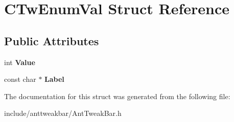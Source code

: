 \hypertarget{structCTwEnumVal}{\section{\-C\-Tw\-Enum\-Val \-Struct \-Reference}
\label{structCTwEnumVal}
}
\subsection*{\-Public \-Attributes}
\begin{DoxyCompactItemize}
\item 
\hypertarget{structCTwEnumVal_ab78c8475076e75b5797842df3aebf8dd}{int {\bfseries \-Value}}\label{structCTwEnumVal_ab78c8475076e75b5797842df3aebf8dd}

\item 
\hypertarget{structCTwEnumVal_a628d9a079774caec505059faa768519b}{const char $\ast$ {\bfseries \-Label}}\label{structCTwEnumVal_a628d9a079774caec505059faa768519b}

\end{DoxyCompactItemize}


\-The documentation for this struct was generated from the following file\-:\begin{DoxyCompactItemize}
\item 
include/anttweakbar/\-Ant\-Tweak\-Bar.\-h\end{DoxyCompactItemize}
